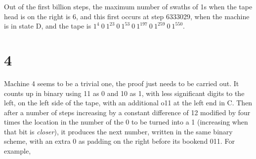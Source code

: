 \documentclass[12pt]{article}
\begin{document}
Out of the first billion steps, the maximum number of swaths of 1s when the tape head is on the right is 6, and this first occurs at step 6333029, when the machine is in state D, and the tape is \texttt{$1^4~0~1^{23}~0~1^{53}~0~1^{197}~0~1^{259}~0~1^{550}$}.




\clearpage
{}
{}
\section*{4}

Machine 4 seems to be a trivial one, the proof just needs to be carried out. It counts up in binary using 11 as 0 and 10 as 1, with less significant digits to the left, on the left side of the tape, with an additional o11 at the left end in C. Then after a number of steps increasing by a constant difference of 12 modified by four times the location in the number of the 0 to be turned into a 1 (increasing when that bit is \emph{closer}), it produces the next number, written in the same binary scheme, with an extra 0 as padding on the right before its bookend 011. For example,
\end{document}
